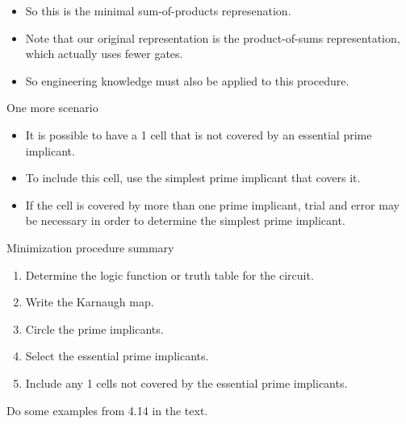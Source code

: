 \begin{itemize}
  \item So this is the minimal sum-of-products represenation.
  \item Note that our original representation is the product-of-sums representation, which actually uses fewer gates.
  \item So engineering knowledge must also be applied to this procedure.
\end{itemize}

\begin{frame}{One more scenario}
  \begin{itemize}
    \item It is possible to have a 1 cell that is not covered by an essential prime implicant.
    \item To include this cell, use the simplest prime implicant that covers it.
    \item If the cell is covered by more than one prime implicant, trial and error may be necessary in order to determine the simplest prime implicant.
  \end{itemize}
\end{frame}

\begin{frame}{Minimization procedure summary}
  \begin{enumerate}
    \item Determine the logic function or truth table for the circuit.
    \item Write the Karnaugh map.
    \item Circle the prime implicants.
    \item Select the essential prime implicants.
    \item Include any 1 cells not covered by the essential prime implicants.
  \end{enumerate}
\end{frame}

Do some examples from 4.14 in the text.


